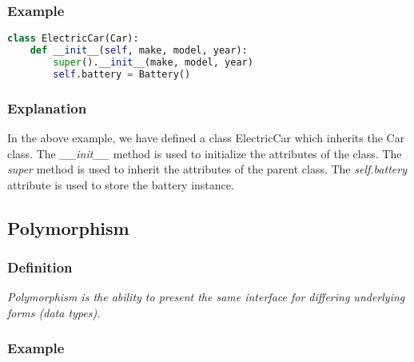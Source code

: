 \documentclass[11pt]{article}
\begin{document}
\subsubsection{Example}

\begin{lstlisting}[language=Python]
class ElectricCar(Car):
    def __init__(self, make, model, year):
        super().__init__(make, model, year)
        self.battery = Battery()
\end{lstlisting}

\subsubsection{Explanation}

In the above example, we have defined a class ElectricCar which inherits the Car class. The \textit{\_\_init\_\_} method is used to initialize the attributes of the class. The \textit{super} method is used to inherit the attributes of the parent class. The \textit{self.battery} attribute is used to store the battery instance.

\subsection{Polymorphism}

\subsubsection{Definition}

\textit{Polymorphism is the ability to present the same interface for differing underlying forms (data types).}

\subsubsection{Example}
\end{document}
